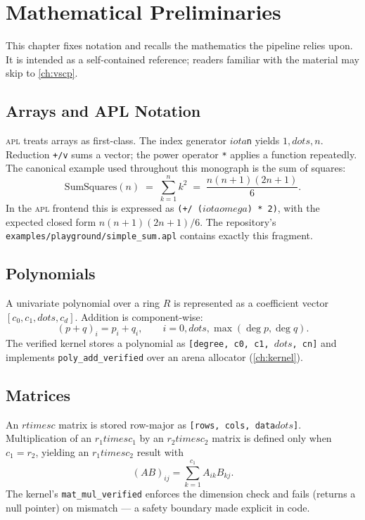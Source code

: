 \chapter{Mathematical Preliminaries}
\label{ch:prelim}

This chapter fixes notation and recalls the mathematics the pipeline relies
upon. It is intended as a self-contained reference; readers familiar with the
material may skip to \cref{ch:vscp}.

\section{Arrays and APL Notation}
\label{sec:pre-apl}

\textsc{apl} treats arrays as first-class. The index generator \texttt{\ensuremath{iota}n}
yields $1,\ensuremath{dots},n$. Reduction \texttt{+/v} sums a vector; the power operator
\verb|*| applies a function repeatedly. The canonical example used throughout
this monograph is the sum of squares:
\begin{equation}
\text{SumSquares}(n) \;=\; \sum_{k=1}^{n} k^{2}
\;=\; \frac{n(n+1)(2n+1)}{6}.
\end{equation}
In the \textsc{apl} frontend this is expressed as \texttt{(+/ (\ensuremath{iota}\ensuremath{omega}) * 2)}, with
the expected closed form $n(n+1)(2n+1)/6$. The repository's
\texttt{examples/playground/simple\_sum.apl} contains exactly this fragment.

\section{Polynomials}
\label{sec:pre-poly}

A univariate polynomial over a ring $R$ is represented as a coefficient vector
$[c_0,c_1,\ensuremath{dots},c_d]$. Addition is component-wise:
\begin{equation}
(p+q)_i = p_i + q_i,\qquad i = 0,\ensuremath{dots},\max(\deg p,\deg q).
\end{equation}
The verified kernel stores a polynomial as \texttt{[degree, c0, c1, \ensuremath{dots},
cn]} and implements \texttt{poly\_add\_verified} over an arena allocator
(\cref{ch:kernel}).

\section{Matrices}
\label{sec:pre-mat}

An $r\ensuremath{times} c$ matrix is stored row-major as \texttt{[rows, cols, data\ensuremath{dots}]}.
Multiplication of an $r_1\ensuremath{times} c_1$ by an $r_2\ensuremath{times} c_2$ matrix is defined
only when $c_1=r_2$, yielding an $r_1\ensuremath{times} c_2$ result with
\begin{equation}
(AB)_{ij} = \sum_{k=1}^{c_1} A_{ik} B_{kj}.
\end{equation}
The kernel's \texttt{mat\_mul\_verified} enforces the dimension check and
fails (returns a null pointer) on mismatch --- a safety boundary made
explicit in code.

